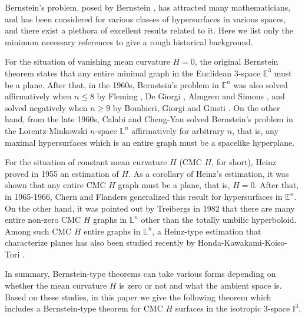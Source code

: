 \documentclass[12pt,a4paper,reqno]{amsart}
\theoremstyle{plain} %
\theoremstyle{definition}
\begin{document}
Bernstein's problem, posed by Bernstein \cite{B, B2}, has attracted many mathematicians, and has been considered for various classes of hypersurfaces in various spaces, and there exist a plethora of excellent results related to it. Here we list only the minimum necessary references to give a rough historical background.

For the situation of vanishing mean curvature $H=0$, the original Bernstein theorem \cite{B, B2} states that any entire minimal graph in the Euclidean $3$-space $\mathbb{E}^3$ must be a plane. After that, in the 1960s, Bernstein's problem in $\mathbb{E}^n$ was also solved affirmatively when $n\leq 8$ by Fleming \cite{Fleming}, De Giorgi \cite{Giorgi}, Almgren \cite{Almgren} and Simons \cite{Simons}, and solved negatively when $n\geq 9$ by Bombieri, Giorgi and Giusti \cite{BGG}.
On the other hand, from the late 1960s, Calabi \cite{C} and Cheng-Yau \cite{CY} solved Bernstein's problem in the Lorentz-Minkowski $n$-space $\mathbb{L}^n$ affirmatively for arbitrary $n$, that is, any maximal hypersurfaces which is an entire graph must be a spacelike hyperplane. 

For the situation of constant mean curvature $H$ (CMC $H$, for short), Heinz \cite{H} proved in 1955 an estimation of $H$. As a corollary of Heinz's estimation, it was shown that any entire CMC $H$ graph must be a plane, that is, $H=0$. After that, in 1965-1966, Chern \cite{Chern} and Flanders \cite{F} generalized this result for hypersurfaces in $\mathbb{E}^n$. 
On the other hand, it was pointed out by Treibergs \cite{T} in 1982 that there are many entire non-zero CMC $H$ graphs in $\mathbb{L}^n$ other than the totally umbilic hyperboloid. 
Among such CMC $H$ entire graphs in $\mathbb{L}^n$, a Heinz-type estimation that characterize planes has also been studied recently by Honda-Kawakami-Koiso-Tori \cite{HKKT}.

In summary, Bernstein-type theorems can take various forms depending on whether the mean curvature $H$ is zero or not and what the ambient space is. 
Based on these studies, in this paper we give the following theorem which includes a Bernstein-type theorem for CMC $H$ surfaces in the isotropic $3$-space $\mathbb{I}^3$.
\end{document}

